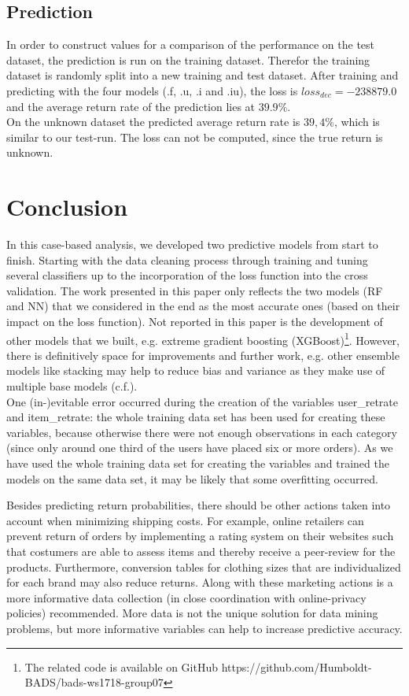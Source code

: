 \documentclass[a4paper,12pt]{article}
\begin{document}
\subsection{Prediction}
In order to construct values for a comparison of the performance on the test dataset, the prediction is run on the training dataset. Therefor the training dataset is randomly split into a new training and test dataset. After training and predicting with the four models (.f, .u, .i and .iu), the loss is $loss_{dec} = -238879.0  $ and the average return rate of the prediction lies at $39.9 \%$.\\
On the unknown dataset the predicted average return rate is $39,4 \%$, which is similar to our test-run. The loss can not be computed, since the true return is unknown.\\

\section{Conclusion}\label{Sec:Conc}


In this case-based analysis, we developed two predictive models from start to finish. Starting with the data cleaning process through training and tuning several classifiers up to the incorporation of the loss function into the cross validation. The work presented in this paper only reflects the two models (RF and NN) that we considered in the end as the most accurate ones (based on their impact on the loss function). Not reported in this paper is the development of other models that we built, e.g. extreme gradient boosting (XGBoost)\footnote{The related code is available on GitHub https://github.com/Humboldt-BADS/bads-ws1718-group07 }. However, there is definitively space for improvements and further work, e.g. other ensemble models like stacking may help to reduce bias and variance as they make use of multiple base models (c.f.\cite{yu2006}). \\
One (in-)evitable error occurred during the creation of the variables user\_retrate and item\_retrate: the whole training data set has been used for creating these variables, because otherwise there were not enough observations in each category (since only around one third of the users have placed six or more orders). As we have used the whole training data set for creating the variables and trained the models on the same data set, it may be likely that some overfitting occurred. 

Besides predicting return probabilities, there should be other actions taken into account when minimizing shipping costs. For example, online retailers can prevent return of orders by implementing a rating system on their websites such that costumers are able to assess items and thereby receive a peer-review for the products. Furthermore, conversion tables for clothing sizes that are individualized for each brand may also reduce returns. Along with these marketing actions is a more informative data collection (in close coordination with online-privacy policies) recommended. More data is not the unique solution for data mining problems, but more informative variables can help to increase predictive accuracy. 

\newpage
%
\nocite{*}
%

\end{document}
